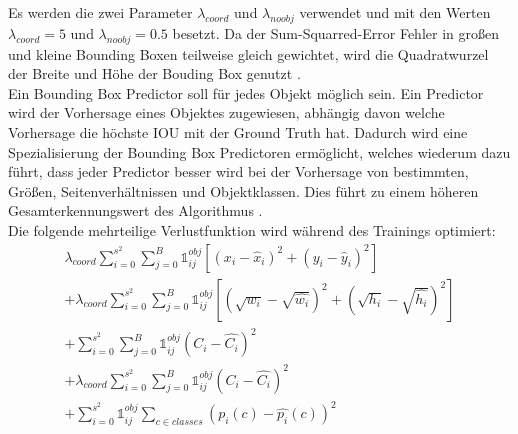 {{	Es werden die zwei Parameter $\lambda_{coord}$ und $\lambda_{noobj}$ verwendet und  mit den Werten  $\lambda_{coord} = 5$ und $\lambda_{noobj} = 0.5$ besetzt.
	Da der Sum-Squarred-Error Fehler in großen und kleine Bounding Boxen teilweise gleich gewichtet, wird die Quadratwurzel der Breite und Höhe der Bouding Box genutzt \citep{Plastiras2018}. \\
	Ein Bounding Box Predictor soll für jedes Objekt möglich sein. Ein Predictor wird  der Vorhersage eines Objektes zugewiesen, abhängig davon welche Vorhersage die höchste IOU mit der Ground Truth hat. Dadurch wird eine Spezialisierung der Bounding Box Predictoren ermöglicht, welches wiederum dazu führt, dass jeder Predictor besser wird bei der Vorhersage von bestimmten, Größen, Seitenverhältnissen und Objektklassen. Dies führt zu einem höheren Gesamterkennungswert des Algorithmus \citep{Plastiras2018}. \\
	Die folgende mehrteilige Verlustfunktion wird während des Trainings optimiert:
	\begin{multline}
		\lambda_{coord} \sum_{i=0}^{s^2} \sum_{j=0}^{B} \mathbb{1}_{i j}^{obj}\left[(x_i-\hat{x}_i)^2 + (y_i - \hat{y}_i)^2\right]\\
		+ \lambda_{coord} \sum_{i=0}^{s^2} \sum_{j=0}^{B} \mathbb{1}_{i j}^{obj}\left[\left(\sqrt{w_i} - \sqrt{\hat{w_i}}\right)^2 + \left(\sqrt{h_i}-\sqrt{\hat{h_i}}\right)^2\right]\\
		+ \sum_{i=0}^{s^2} \sum_{j=0}^{B} \mathbb{1}_{i j}^{obj}\left(C_i - \hat{C_i}\right)^2\\
		+ \lambda_{coord} \sum_{i=0}^{s^2} \sum_{j=0}^{B} \mathbb{1}_{i j}^{obj}\left(C_i - \hat{C_i}\right)^2\\
		+ \sum_{i=0}^{s^2} \mathbb{1}_{i j}^{obj} \sum_{c \in classes } \left(p_i(c)-\hat{p_i}(c)\right)^2
	\end{multline}



	



	} 
	
}



